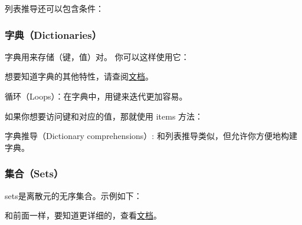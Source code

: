 
列表推导还可以包含条件：




\subsubsection{字典（Dictionaries）}


字典用来存储（键，值）对。%
你可以这样使用它：


想要知道字典的其他特性，请查阅\href{https://docs.python.org/3.5/library/stdtypes.html#dict}{文档}。




循环（Loops）：在字典中，用键来迭代更加容易。





如果你想要访问键和对应的值，那就使用 items 方法：



字典推导（Dictionary comprehensions）: 和列表推导类似，但允许你方便地构建字典。



\subsubsection{集合（Sets）}


sets是离散元的无序集合。示例如下：


和前面一样，要知道更详细的，查看\href{https://docs.python.org/3.5/library/stdtypes.html#set}{文档}。



